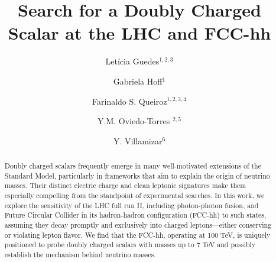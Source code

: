 \documentclass[aps, prev, twocolumn, preprintnumbers, floatfix, nofootinbib]{revtex4-1}
\begin{document}
 

\title{Search for a Doubly Charged Scalar at the LHC and FCC-hh}

\author{Letícia Guedes$^{1,2,3}$}
\author{Gabriela Hoff$^{1}$}
\author{Farinaldo S. Queiroz$^{1,2,3,4}$}
\author{Y.M. Oviedo-Torres $^{2,5}$}
\author{Y. Villamizar$^{6}$}



\begin{abstract}
Doubly charged scalars frequently emerge in many well-motivated extensions of the Standard Model, particularly in frameworks that aim to explain the origin of neutrino masses. Their distinct electric charge and clean leptonic signatures make them especially compelling from the standpoint of experimental searches. In this work, we explore the sensitivity of the LHC full run II, including photon-photon fusion, and Future Circular Collider in its hadron-hadron configuration (FCC-hh) to such states, assuming they decay promptly and exclusively into charged leptons—either conserving or violating lepton flavor. We find that the FCC-hh, operating at 100 TeV, is uniquely positioned to probe doubly charged scalars with masses up to 7 TeV and possibly establish the mechanism behind neutrino masses. 
\end{abstract}

\maketitle
\flushbottom
\end{document}
